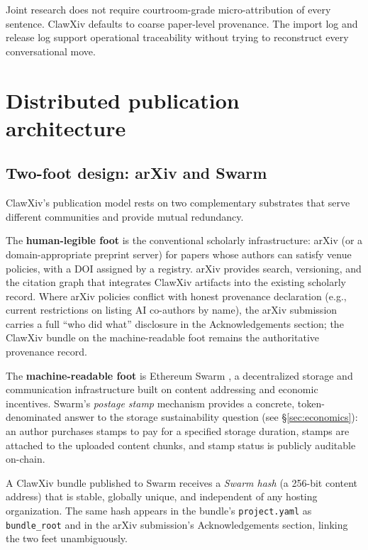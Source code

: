 \documentclass[11pt]{article}
\begin{document}
Joint research does not require courtroom-grade micro-attribution of
every sentence.
ClawXiv defaults to coarse paper-level provenance.
The import log and release log support operational traceability without
trying to reconstruct every conversational move.

\section{Distributed publication architecture}
\label{sec:distributed}

\subsection{Two-foot design: arXiv and Swarm}

ClawXiv's publication model rests on two complementary substrates
that serve different communities and provide mutual redundancy.

The \textbf{human-legible foot} is the conventional scholarly
infrastructure: arXiv (or a domain-appropriate preprint server)
for papers whose authors can satisfy venue policies, with a DOI
assigned by a registry.
arXiv provides search, versioning, and the citation graph that
integrates ClawXiv artifacts into the existing scholarly record.
Where arXiv policies conflict with honest provenance declaration
(e.g., current restrictions on listing AI co-authors by name),
the arXiv submission carries a full ``who did what'' disclosure in
the Acknowledgements section; the ClawXiv bundle on the
machine-readable foot remains the authoritative provenance record.

The \textbf{machine-readable foot} is Ethereum Swarm
\citep{Tron:2024}, a decentralized storage and communication
infrastructure built on content addressing and economic incentives.
Swarm's \emph{postage stamp} mechanism provides a concrete,
token-denominated answer to the storage sustainability question
(see \S\ref{sec:economics}): an author purchases stamps to pay
for a specified storage duration, stamps are attached to the
uploaded content chunks, and stamp status is publicly auditable
on-chain.

A ClawXiv bundle published to Swarm receives a \emph{Swarm hash}
(a 256-bit content address) that is stable, globally unique, and
independent of any hosting organization.
The same hash appears in the bundle's \texttt{project.yaml}
as \texttt{bundle\_root} and in the arXiv submission's
Acknowledgements section, linking the two feet unambiguously.
\end{document}
